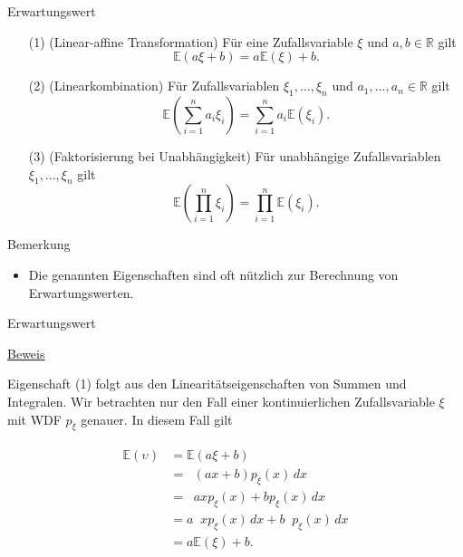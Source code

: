 \documentclass[
  8pt,
  ignorenonframetext,
]{beamer}
\providecommand{\tightlist}{%
  \setlength{\itemsep}{0pt}\setlength{\parskip}{0pt}}
\newcommand{\ups}{\upsilon}
\DeclareMathOperator*{\intinf}{\int_{-\infty}^{\infty}}
\begin{document}
\begin{frame}{Erwartungswert}
\protect\hypertarget{erwartungswert-4}{}
\small
\begin{theorem}
\normalfont
\justifying
\begin{itemize}
\item[(1)] (Linear-affine Transformation) Für eine Zufallsvariable $\xi$ und $a,b\in \mathbb{R}$ gilt
\begin{equation}
\mathbb{E}(a\xi + b) = a\mathbb{E}(\xi) + b.
\end{equation}
\item[(2)] (Linearkombination) Für Zufallsvariablen $\xi_1,...,\xi_n$ und $a_1,...,a_n \in \mathbb{R}$ gilt
\begin{equation}
\mathbb{E}\left(\sum_{i=1}^n a_i\xi_i \right) = \sum_{i = 1}^n a_i \mathbb{E}(\xi_i).
\end{equation}
\item [(3)] (Faktorisierung bei Unabhängigkeit) Für unabhängige Zufallsvariablen $\xi_1,...,\xi_n$ gilt
\begin{equation}
\mathbb{E}\left(\prod_{i=1}^n \xi_i \right) = \prod_{i = 1}^n \mathbb{E}(\xi_i).
\end{equation}
\end{itemize}
\end{theorem}

\footnotesize

Bemerkung

\begin{itemize}
\tightlist
\item
  Die genannten Eigenschaften sind oft nützlich zur Berechnung von
  Erwartungswerten.
\end{itemize}
\end{frame}

\begin{frame}{Erwartungswert}
\protect\hypertarget{erwartungswert-5}{}
\footnotesize

\underline{Beweis} \vspace{2mm}

Eigenschaft (1) folgt aus den Linearitätseigenschaften von Summen und
Integralen. Wir betrachten nur den Fall einer kontinuierlichen
Zufallsvariable \(\xi\) mit WDF \(p_\xi\) genauer. In diesem Fall gilt

\begin{align}
\begin{split}
\mathbb{E}(\ups)
& = \mathbb{E}(a\xi + b)                        \\
& = \intinf (ax + b)p_\xi(x) \,dx               \\
& = \intinf  axp_\xi(x)  + b p_\xi(x) \,dx          \\
& = a\intinf xp_\xi(x) \,dx + b \intinf p_\xi(x) \,dx   \\
& = a\mathbb{E}(\xi) + b.
\end{split}
\end{align}
\end{frame}
\end{document}
